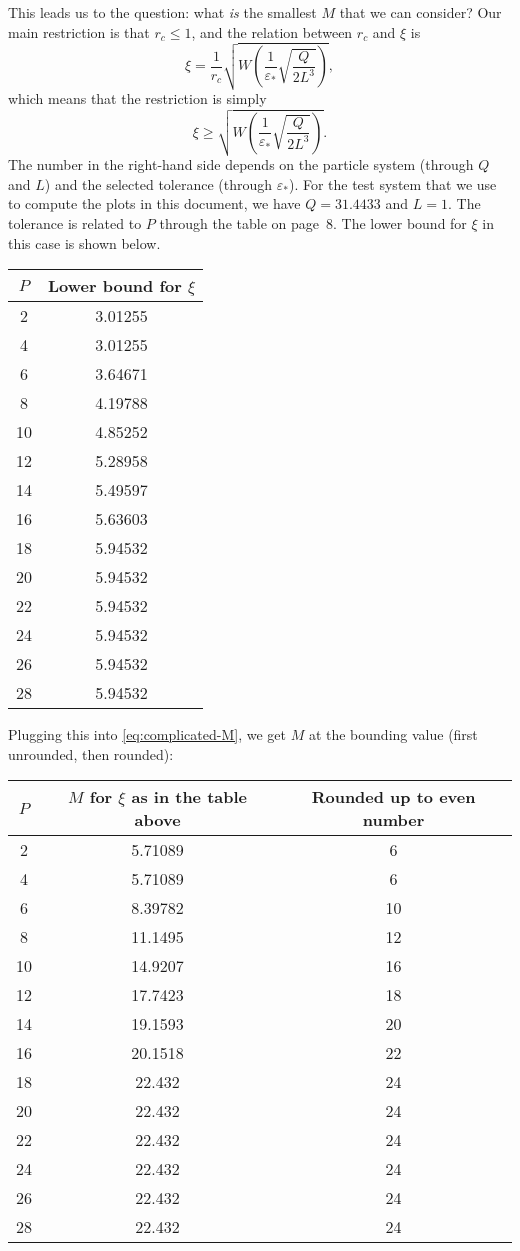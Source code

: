 \documentclass[a4paper,10pt]{article}
\begin{document}
This leads us to the question: what \emph{is} the smallest $M$
that we can consider? Our main restriction is that $r_c \leq 1$,
and the relation between $r_c$ and $\xi$ is
\[
  \xi = \frac{1}{r_c} \sqrt{W \left( \frac{1}{\varepsilon_*}
  \sqrt{\frac{Q}{2L^3}} \right)},
\]
which means that the restriction is simply
\[
  \xi \geq \sqrt{W \left( \frac{1}{\varepsilon_*}
  \sqrt{\frac{Q}{2L^3}} \right)}.
\]
The number in the right-hand side depends on the particle system
(through $Q$ and $L$) and the selected tolerance (through
$\varepsilon_*$). For the test system that we use to compute the
plots in this document, we have $Q=31.4433$ and $L=1$. The
tolerance is related to $P$ through the table on page~8. The
lower bound for $\xi$ in this case is shown below.
\begin{center}
  \begin{tabular}{cc}
    \toprule
    $P$ & Lower bound for $\xi$ \\
    \midrule
    2 & 3.01255 \\
    4 & 3.01255 \\
    6 & 3.64671 \\
    8 & 4.19788 \\
    10 & 4.85252 \\
    12 & 5.28958 \\
    14 & 5.49597 \\
    16 & 5.63603 \\
    18 & 5.94532 \\
    20 & 5.94532 \\
    22 & 5.94532 \\
    24 & 5.94532 \\
    26 & 5.94532 \\
    28 & 5.94532 \\
    \bottomrule
  \end{tabular}
\end{center}
Plugging this into \eqref{eq:complicated-M}, we get $M$ at the
bounding value (first unrounded, then rounded):
\begin{center}
  \begin{tabular}{ccc}
    \toprule
    $P$ & $M$ for $\xi$ as in the table above & Rounded up to even number \\
    \midrule
    2 & 5.71089 & 6 \\
    4 & 5.71089 & 6 \\
    6 & 8.39782 & 10 \\
    8 & 11.1495 & 12 \\
    10 & 14.9207 & 16 \\
    12 & 17.7423 & 18 \\
    14 & 19.1593 & 20 \\
    16 & 20.1518 & 22 \\
    18 & 22.432 & 24 \\
    20 & 22.432 & 24 \\
    22 & 22.432 & 24 \\
    24 & 22.432 & 24 \\
    26 & 22.432 & 24 \\
    28 & 22.432 & 24 \\
    \bottomrule
  \end{tabular}
\end{center}
\end{document}
